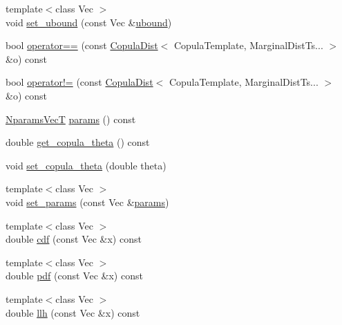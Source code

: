 \begin{DoxyCompactItemize}
\item 
{\footnotesize template$<$class Vec $>$ }\\void \hyperlink{classprior__hessian_1_1CopulaDistImpl_1_1CopulaDist_a4b010ffe2c2acd4dc75c80b32312254d}{set\+\_\+ubound} (const Vec \&\hyperlink{classprior__hessian_1_1CopulaDistImpl_1_1CopulaDist_abdb39f0c5f7f5f4b16bf501e6083d5b6}{ubound})
\item 
bool \hyperlink{classprior__hessian_1_1CopulaDistImpl_1_1CopulaDist_a9dca9ab8ba47ecef1a7784fe77c8c40f}{operator==} (const \hyperlink{classprior__hessian_1_1CopulaDistImpl_1_1CopulaDist}{Copula\+Dist}$<$ Copula\+Template, Marginal\+Dist\+Ts... $>$ \&o) const 
\item 
bool \hyperlink{classprior__hessian_1_1CopulaDistImpl_1_1CopulaDist_a5cd91617bed91a4c401ad05f52958010}{operator!=} (const \hyperlink{classprior__hessian_1_1CopulaDistImpl_1_1CopulaDist}{Copula\+Dist}$<$ Copula\+Template, Marginal\+Dist\+Ts... $>$ \&o) const 
\item 
\hyperlink{classprior__hessian_1_1CopulaDistImpl_1_1CopulaDist_ab23894c0a0c555b0b759e3c77df6a987}{Nparams\+VecT} \hyperlink{classprior__hessian_1_1CopulaDistImpl_1_1CopulaDist_a0ca7e24c5dba13279c613c95434b46a2}{params} () const 
\item 
double \hyperlink{classprior__hessian_1_1CopulaDistImpl_1_1CopulaDist_a5299ecbf6aed216acfb8d67e8bfc6aff}{get\+\_\+copula\+\_\+theta} () const 
\item 
void \hyperlink{classprior__hessian_1_1CopulaDistImpl_1_1CopulaDist_a0cfc287d14f8d0821ea4ad7fa254eeec}{set\+\_\+copula\+\_\+theta} (double theta)
\item 
{\footnotesize template$<$class Vec $>$ }\\void \hyperlink{classprior__hessian_1_1CopulaDistImpl_1_1CopulaDist_a6ab1f6755caac5e7127ec8c6e6ed2c06}{set\+\_\+params} (const Vec \&\hyperlink{classprior__hessian_1_1CopulaDistImpl_1_1CopulaDist_a0ca7e24c5dba13279c613c95434b46a2}{params})
\item 
{\footnotesize template$<$class Vec $>$ }\\double \hyperlink{classprior__hessian_1_1CopulaDistImpl_1_1CopulaDist_a75da47e40ee64dd49fe5c84c2df07ebe}{cdf} (const Vec \&x) const 
\item 
{\footnotesize template$<$class Vec $>$ }\\double \hyperlink{classprior__hessian_1_1CopulaDistImpl_1_1CopulaDist_aa35ac17e403f5f7a74852abca16c2847}{pdf} (const Vec \&x) const 
\item 
{\footnotesize template$<$class Vec $>$ }\\double \hyperlink{classprior__hessian_1_1CopulaDistImpl_1_1CopulaDist_ab0a3b61bdc3afe2d6b3ff7f076b7fd60}{llh} (const Vec \&x) const 

\end{DoxyCompactItemize}
